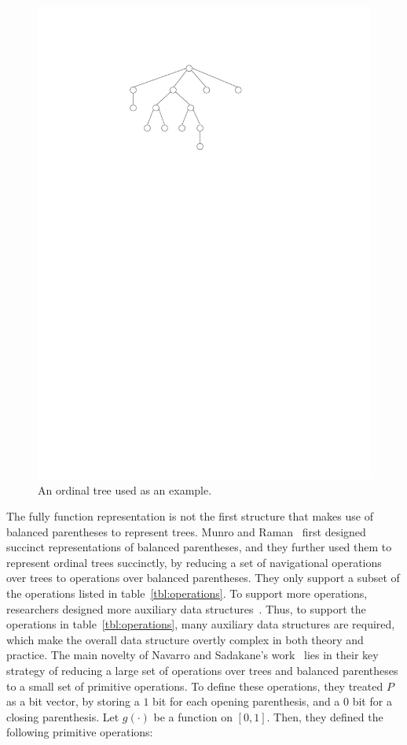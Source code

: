 \begin{figure}
\centering
\includegraphics[scale=0.5]{images/bp.pdf}
\caption{An ordinal tree used as an example.}
\label{figure:bp}
\end{figure}

The fully function representation is not the first structure that makes use of balanced parentheses to represent trees. 
Munro and Raman~\cite{mr1997} first designed succinct representations of balanced parentheses, and they further used them to represent ordinal trees succinctly, by reducing a set of navigational operations over trees to operations over balanced parentheses. 
They only support a subset of the operations listed in table~\ref{tbl:operations}. 
To support more operations, researchers designed more auxiliary data structures~\cite{ly2008}. 
Thus, to support the operations in table~\ref{tbl:operations}, many auxiliary data structures are required, which make the overall data structure overtly complex in both theory and practice. 
The main novelty of Navarro and Sadakane's work~\cite{Navarro:2014:FFS:2620785.2601073} lies in their key strategy of reducing a large set of operations over trees and balanced parentheses to a small set of primitive operations. 
To define these operations, they treated $P$ as a bit vector, by storing a $1$ bit for each opening parenthesis, and a $0$ bit for a closing parenthesis. 
Let $g(\cdot)$ be a function on $[0,1]$. Then, they defined the following primitive operations:

